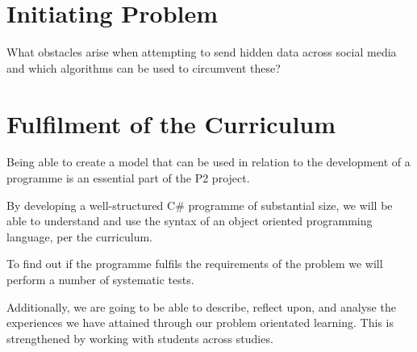 \documentclass[a4paper,12pt,hidelinks]{article}
\begin{document}
	\section*{Initiating Problem}
What obstacles arise when attempting to send hidden data across social media and which algorithms can be used to circumvent these?

	\section*{Fulfilment of the Curriculum}
Being able to create a model that can be used in relation to the development of a programme is an essential part of the P2 project. 

By developing a well-structured C\# programme of substantial size, we will be able to understand and use the syntax of an object oriented programming language, per the curriculum.

To find out if the programme fulfils the requirements of the problem we will perform a number of systematic tests.

Additionally, we are going to be able to describe, reflect upon, and analyse the experiences we have attained through our problem orientated learning. This is strengthened by working with students across studies.

 
\end{document}
